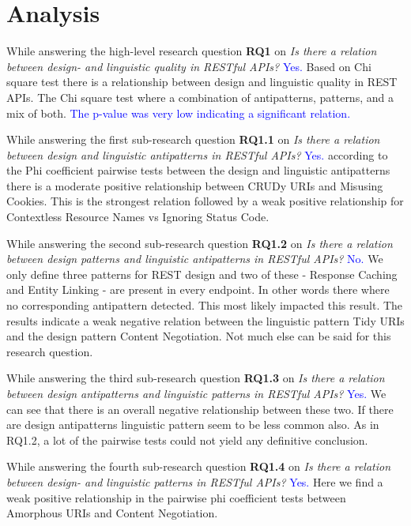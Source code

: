 \section{Analysis}

While answering the high-level research question  \textbf{RQ1} on \textit{Is there a relation between design- and linguistic quality in RESTful APIs?} \textcolor{blue}{Yes.} Based on Chi square test there is a relationship between design and linguistic quality in REST APIs. The Chi square test where a combination of antipatterns, patterns, and a mix of both. \textcolor{blue}{The p-value was very low indicating a significant relation.}

While answering the first sub-research question \textbf{RQ1.1} on \textit{Is there a relation between design and linguistic antipatterns in RESTful APIs?} \textcolor{blue}{Yes.} according to the Phi coefficient pairwise tests between the design and linguistic antipatterns there is a moderate positive relationship between CRUDy URIs and Misusing Cookies. This is the strongest relation followed by a weak positive relationship for Contextless Resource Names vs Ignoring Status Code.

While answering the second sub-research question \textbf{RQ1.2} on \textit{Is there a relation between design patterns and linguistic antipatterns in RESTful APIs?} \textcolor{blue}{No.} We only define three patterns for REST design and two of these - Response Caching and  Entity Linking - are present in every endpoint. In other words there where no corresponding antipattern detected. This most likely impacted this result. The results indicate a weak negative relation between the linguistic pattern Tidy URIs and the design pattern Content Negotiation. Not much else can be said for this research question.

While answering the third sub-research question  \textbf{RQ1.3} on \textit{Is there a relation between design antipatterns and linguistic patterns in RESTful APIs?} \textcolor{blue}{Yes.} We can see that there is an overall negative relationship between these two. If there are design antipatterns linguistic pattern seem to be less common also. As in RQ1.2, a lot of the pairwise tests could not yield any definitive conclusion.

While answering the fourth sub-research question \textbf{RQ1.4} on \textit{Is there a relation between design- and linguistic patterns in RESTful APIs?} \textcolor{blue}{Yes.} Here we find a weak positive relationship in the pairwise phi coefficient tests between Amorphous URIs and Content Negotiation.

